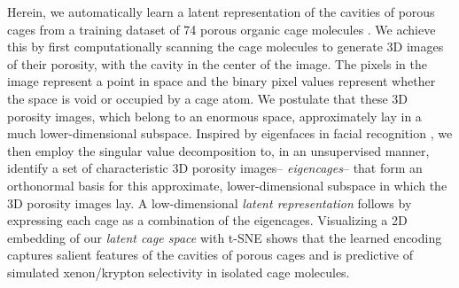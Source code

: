 \documentclass[journal=jacsat,manuscript=article,layout=traditional]{achemso}
\begin{document}
Herein, we automatically learn a latent representation of the cavities of porous cages from a training dataset of 74 porous organic cage molecules \cite{miklitz2017computational,greenaway2018high}. We achieve this by first computationally scanning the cage molecules to generate 3D images of their porosity, {\color{red} with the cavity in the center of the image}. The pixels in the image represent a point in space and the binary pixel values represent whether the space is void or occupied by a cage atom.
We postulate that these 3D porosity images, which belong to an enormous space, approximately lay in a much lower-dimensional subspace. Inspired by eigenfaces in facial recognition \cite{sirovich1987low,turk1991face,muller2004singular}, we then employ the singular value decomposition to, in an unsupervised manner, identify a set of characteristic 3D porosity images-- \emph{eigencages}-- that form an orthonormal basis for this approximate, lower-dimensional subspace in which the 3D porosity images lay. A low-dimensional \emph{latent representation} follows by expressing each cage as a combination of the eigencages. {\color{red} Visualizing a 2D embedding of our \emph{latent cage space} with t-SNE \cite{maaten2008visualizing}} shows that the learned encoding captures salient features of the cavities of porous cages and is predictive of simulated xenon/krypton selectivity {\color{red} in isolated cage molecules}.



\end{document}
